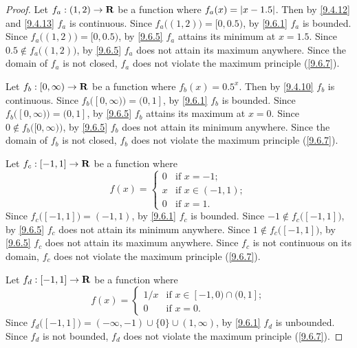 \begin{proof}
  Let \(f_a : (1, 2) \to \mathbf{R}\) be a function where \(f_a(x) = \left\lvert x - 1.5\right\rvert\).
  Then by \cref{9.4.12} and \cref{9.4.13} \(f_a\) is continuous.
  Since \(f_a\big((1, 2)\big) = [0, 0.5)\), by \cref{9.6.1} \(f_a\) is bounded.
  Since \(f_a\big((1, 2)\big) = [0, 0.5)\), by \cref{9.6.5} \(f_a\) attains its minimum at \(x = 1.5\).
  Since \(0.5 \notin f_a\big((1, 2)\big)\), by \cref{9.6.5} \(f_a\) does not attain its maximum anywhere.
  Since the domain of \(f_a\) is not closed, \(f_a\) does not violate the maximum principle (\cref{9.6.7}).

  Let \(f_b : [0, \infty) \to \mathbf{R}\) be a function where \(f_b(x) = 0.5^x\).
  Then by \cref{9.4.10} \(f_b\) is continuous.
  Since \(f_b\big([0, \infty)\big) = (0, 1]\), by \cref{9.6.1} \(f_b\) is bounded.
  Since \(f_b\big([0, \infty)\big) = (0, 1]\), by \cref{9.6.5} \(f_b\) attains its maximum at \(x = 0\).
  Since \(0 \notin f_b\big([0, \infty)\big)\), by \cref{9.6.5} \(f_b\) does not attain its minimum anywhere.
  Since the domain of \(f_b\) is not closed, \(f_b\) does not violate the maximum principle (\cref{9.6.7}).

  Let \(f_c : [-1, 1] \to \mathbf{R}\) be a function where
  \[
    f(x) = \begin{cases}
      0 & \text{if } x = -1;        \\
      x & \text{if } x \in (-1, 1); \\
      0 & \text{if } x = 1.
    \end{cases}
  \]
  Since \(f_c\big([-1, 1]\big) = (-1, 1)\), by \cref{9.6.1} \(f_c\) is bounded.
  Since \(-1 \notin f_c\big([-1, 1]\big)\), by \cref{9.6.5} \(f_c\) does not attain its minimum anywhere.
  Since \(1 \notin f_c\big([-1, 1]\big)\), by \cref{9.6.5} \(f_c\) does not attain its maximum anywhere.
  Since \(f_c\) is not continuous on its domain, \(f_c\) does not violate the maximum principle (\cref{9.6.7}).

  Let \(f_d : [-1, 1] \to \mathbf{R}\) be a function where
  \[
    f(x) = \begin{cases}
      1 / x & \text{if } x \in [-1, 0) \cap (0, 1]; \\
      0     & \text{if } x = 0.
    \end{cases}
  \]
  Since \(f_d\big([-1, 1]\big) = (-\infty, -1) \cup \{0\} \cup (1, \infty)\), by \cref{9.6.1} \(f_d\) is unbounded.
  Since \(f_d\) is not bounded, \(f_d\) does not violate the maximum principle (\cref{9.6.7}).
\end{proof}

